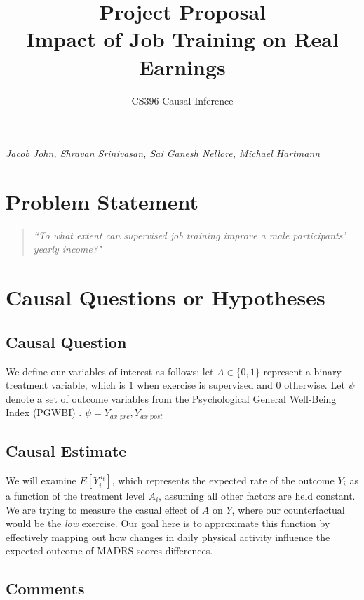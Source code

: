 \documentclass[12pt]{article}
\title{Project Proposal\\ 
\large Impact of Job Training on Real Earnings\vspace{-1em}}
\author{CS396 Causal Inference}
\begin{document}
\maketitle

\noindent \textit{Jacob John, Shravan Srinivasan, Sai Ganesh Nellore, Michael Hartmann}

\section{Problem Statement}

\begin{tcolorbox}
\begin{quote} \centering \textit{``To what extent can supervised job training improve a male participants' yearly income?"} \end{quote}
\end{tcolorbox}



\section{Causal Questions or Hypotheses}

\subsection{Causal Question}

We define our variables of interest as follows: let $A \in \{0, 1\}$ represent a binary treatment variable, which is $1$ when exercise is supervised and $0$ otherwise. Let $\psi$ denote a set of outcome variables from the Psychological General Well-Being Index (PGWBI) \cite{Grossi2014}. $\psi = {Y_{ax\_pre}, Y_{ax\_post}}$

\subsection{Causal Estimate}

We will examine $E[Y_{i}^{a_t}]$, which represents the expected rate of the outcome $Y_i$ as a function of the treatment level $A_i$, assuming all other factors are held constant. We are trying to measure the casual effect of $A$ on $Y$, where our counterfactual would be the \textit{low} exercise. Our goal here is to approximate this function by effectively mapping out how changes in daily physical activity influence the expected outcome of MADRS scores differences.

\subsection{Comments}
\end{document}
